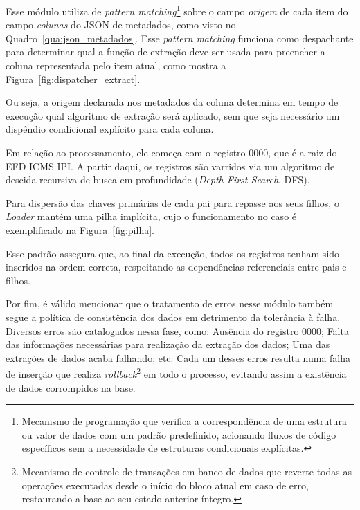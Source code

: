 Esse módulo utiliza de \textit{pattern matching}\footnote{Mecanismo de
programação que verifica a correspondência de uma estrutura ou valor de dados
com um padrão predefinido, acionando fluxos de código específicos sem a
necessidade de estruturas condicionais explícitas.} sobre o campo
\textit{origem} de cada item do campo \textit{colunas} do JSON de metadados,
como visto no Quadro~\ref{qua:json_metadados}. Esse \textit{pattern matching}
funciona como despachante para determinar qual a função de extração deve ser
usada para preencher a coluna representada pelo item atual, como mostra a
Figura~\ref{fig:dispatcher_extract}.

\clearpage

Ou seja, a origem declarada nos metadados da coluna determina em tempo de
execução qual algoritmo de extração será aplicado, sem que seja necessário um
dispêndio condicional explícito para cada coluna.

Em relação ao processamento, ele começa com o registro 0000, que é a raiz do
EFD ICMS IPI. A partir daqui, os registros são varridos via um algoritmo de
descida recursiva de busca em profundidade (\textit{Depth-First Search}, DFS).

Para dispersão das chaves primárias de cada pai para repasse aos seus filhos,
o \textit{Loader} mantém uma pilha implícita, cujo o funcionamento no caso é
exemplificado na Figura~\ref{fig:pilha}.

\clearpage

Esse padrão assegura que, ao final da execução, todos os registros tenham sido
inseridos na ordem correta, respeitando as dependências referenciais entre pais
e filhos.

Por fim, é válido mencionar que o tratamento de erros nesse módulo também segue
a política de consistência dos dados em detrimento da tolerância à falha.
Diversos erros são catalogados nessa fase, como: Ausência do registro 0000;
Falta das informações necessárias para realização da extração dos dados;
Uma das extrações de dados acaba falhando; etc. Cada um desses erros resulta
numa falha de inserção que realiza \textit{rollback}\footnote{Mecanismo de
controle de transações em banco de dados que reverte todas as operações
executadas desde o início do bloco atual em caso de erro, restaurando a base ao
seu estado anterior íntegro.} em todo o processo, evitando assim a existência
de dados corrompidos na base.
